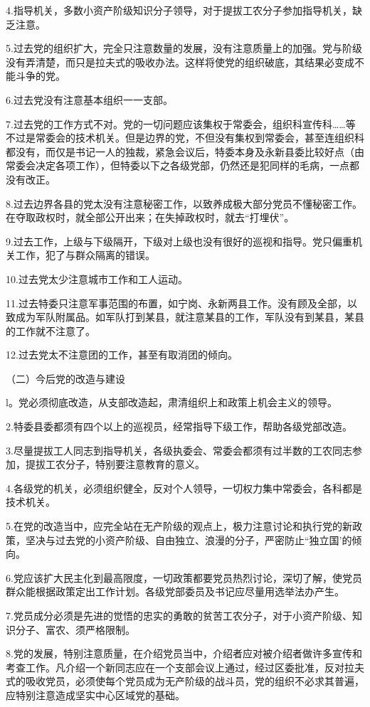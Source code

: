 4.指导机关，多数小资产阶级知识分子领导，对于提拔工农分子参加指导机关，缺乏注意。

5.过去党的组织扩大，完全只注意数量的发展，没有注意质量上的加强。党与阶级没有弄清楚，而只是拉夫式的吸收办法。这样将使党的组织破底，其结果必变成不能斗争的党。

6.过去党没有注意基本组织一一支部。

7.过去党的工作方式不对。党的一切问题应该集权于常委会，组织科宣传科……等不过是常委会的技术机关。但是边界的党，不但没有集权到常委会，甚至连组织科都没有，而仅是书记一人的独裁，紧急会议后，特委本身及永新县委比较好点（由常委会决定各项工作），但特委以下之各级党部，仍然还是犯同样的毛病，一点都没有改正。

8.过去边界各县的党太没有注意秘密工作，以致养成极大部分党员不懂秘密工作。在夺取政权时，就全部公开出来；在失掉政权时，就去“打埋伏”。

9.过去工作，上级与下级隔开，下级对上级也没有很好的巡视和指导。党只偏重机关工作，犯了与群众隔离的错误。

10.过去党太少注意城市工作和工人运动。

11.过去特委只注意军事范围的布置，如宁岗、永新两县工作。没有顾及全部，以致成为军队附属品。如军队打到某县，就注意某县的工作，军队没有到某县，某县的工作就不注意了。

12.过去党太不注意团的工作，甚至有取消团的倾向。

（二）今后党的改造与建设

l。党必须彻底改造，从支部改造起，肃清组织上和政策上机会主义的领导。

2.特委县委都须有四个以上的巡视员，经常指导下级工作，帮助各级党部改造。

3.尽量提拔工人同志到指导机关，各级执委会、常委会都须有过半数的工农同志参加，提拔工农分子，特别要注意教育的意义。

4.各级党的机关，必须组织健全，反对个人领导，一切权力集中常委会，各科都是技术机关。

5.在党的改造当中，应完全站在无产阶级的观点上，极力注意讨论和执行党的新政策，坚决与过去党的小资产阶级、自由独立、浪漫的分子，严密防止“独立国’的倾向。

6.党应该扩大民主化到最高限度，一切政策都要党员热烈讨论，深切了解，使党员群众能根据政策定出工作计划。各级党部委员及书记应尽量用选举法办产生。

7.党员成分必须是先进的觉悟的忠实的勇敢的贫苦工农分子，对于小资产阶级、知识分子、富农、须严格限制。

8.党的发展，特别注意质量，在介绍党员当中，介绍者应对被介绍者做许多宣传和考查工作。凡介绍一个新同志应在一个支部会议上通过，经过区委批准，反对拉夫式的吸收党员，必须使每个党员成为无产阶级的战斗员，党的组织不必求其普遍，应特别注意造成坚实中心区域党的基础。

